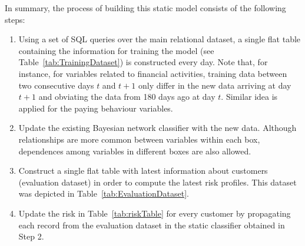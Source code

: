 In summary, the process of building this static model consists of the following steps:

\begin{enumerate}
\item Using a set of SQL queries over the main relational dataset, a single flat table containing the information for training the model (see Table~\ref{tab:TrainingDataset}) is constructed every day. Note that, for instance, for variables related to financial activities, training data between two consecutive days $t$ and $t+1$ only differ in the new data arriving at day $t+1$ and obviating the data from 180 days ago at day $t$. Similar idea is applied for the paying behaviour variables.
\item Update the existing Bayesian network classifier with the new data.  Although relationships are more common between variables within each box, dependences among variables in different boxes are also allowed. 
\item Construct a single flat table with latest information about customers (evaluation dataset) in order to compute the latest risk profiles. This dataset was depicted in Table~\ref{tab:EvaluationDataset}.
\item Update the risk in Table~\ref{tab:riskTable} for every customer by propagating each record from the evaluation dataset in the static classifier obtained in Step 2. 
\end{enumerate}





